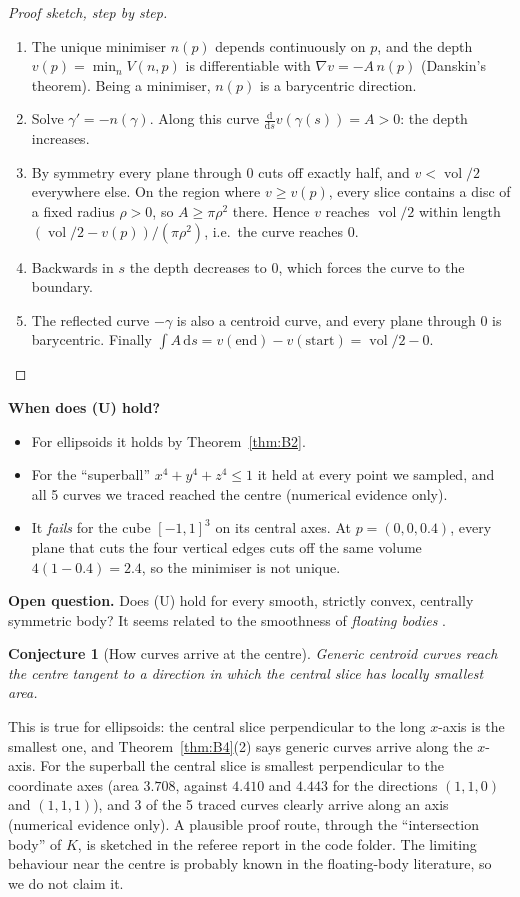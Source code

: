 \documentclass[11pt]{article}
\theoremstyle{plain}
\newtheorem{conjecture}[lemma]{Conjecture}
\theoremstyle{definition}
\theoremstyle{remark}
\newcommand{\vol}{\operatorname{vol}}
\newcommand{\dd}{\,\mathrm{d}}
\begin{document}
\begin{proof}[Proof sketch, step by step]
\begin{enumerate}[label=(\roman*),nosep]
\item The unique minimiser $n(p)$ depends continuously on $p$, and the depth $v(p)=\min_nV(n,p)$ is differentiable with $\nabla v=-A\,n(p)$ (Danskin's theorem). Being a minimiser, $n(p)$ is a barycentric direction.
\item Solve $\gamma'=-n(\gamma)$. Along this curve $\frac{\mathrm d}{\mathrm ds}v(\gamma(s))=A>0$: the depth increases.
\item By symmetry every plane through $0$ cuts off exactly half, and $v<\vol/2$ everywhere else. On the region where $v\ge v(p)$, every slice contains a disc of a fixed radius $\rho>0$, so $A\ge\pi\rho^2$ there. Hence $v$ reaches $\vol/2$ within length $(\vol/2-v(p))/(\pi\rho^2)$, i.e.\ the curve reaches $0$.
\item Backwards in $s$ the depth decreases to $0$, which forces the curve to the boundary.
\item The reflected curve $-\gamma$ is also a centroid curve, and every plane through $0$ is barycentric. Finally $\int A\dd s=v(\text{end})-v(\text{start})=\vol/2-0$.\qedhere
\end{enumerate}
\end{proof}

\noindent\textbf{When does (U) hold?}
\begin{itemize}[nosep]
\item For ellipsoids it holds by Theorem~\ref{thm:B2}.
\item For the ``superball'' $x^4+y^4+z^4\le1$ it held at every point we sampled, and all 5 curves we traced reached the centre (numerical evidence only).
\item It \emph{fails} for the cube $[-1,1]^3$ on its central axes. At $p=(0,0,0.4)$, every plane that cuts the four vertical edges cuts off the same volume $4(1-0.4)=2.4$, so the minimiser is not unique.
\end{itemize}
\textbf{Open question.} Does (U) hold for every smooth, strictly convex, centrally symmetric body? It seems related to the smoothness of \emph{floating bodies} \cite{meyer-reisner}.

\begin{conjecture}[How curves arrive at the centre]
Generic centroid curves reach the centre tangent to a direction in which the central slice has \emph{locally smallest} area.
\end{conjecture}
This is true for ellipsoids: the central slice perpendicular to the long $x$-axis is the smallest one, and Theorem~\ref{thm:B4}(2) says generic curves arrive along the $x$-axis. For the superball the central slice is smallest perpendicular to the coordinate axes (area $3.708$, against $4.410$ and $4.443$ for the directions $(1,1,0)$ and $(1,1,1)$), and 3 of the 5 traced curves clearly arrive along an axis (numerical evidence only). A plausible proof route, through the ``intersection body'' of $K$, is sketched in the referee report in the code folder. The limiting behaviour near the centre is probably known in the floating-body literature, so we do not claim it.
\end{document}
